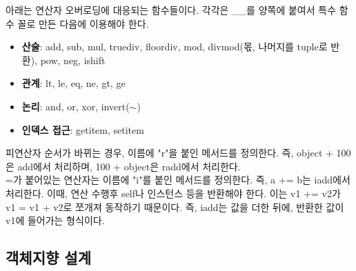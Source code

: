 아래는 연산자 오버로딩에 대응되는 함수들이다. 각각은 \_\_를 양쪽에 붙여서 특수 함수 꼴로 만든 다음에 이용해야 한다.
\begin{itemize}
\item \textbf{산술}: add, sub, mul, truediv, floordiv, mod, divmod(몫, 나머지를 tuple로 반환), pow, neg, ishift
\item \textbf{관계}: lt, le, eq, ne, gt, ge
\item \textbf{논리}: and, or, xor, invert($\sim$)
\item \textbf{인덱스 접근}: getitem, setitem
\end{itemize}

피연산자 순서가 바뀌는 경우, 이름에 "r"을 붙인 메서드를 정의한다. 즉, object + 100은 add에서 처리하며, 100 + object은 radd에서 처리한다.\\
=가 붙어있는 연산자는 이름에 "i"를 붙인 메서드를 정의한다. 즉, a += b는 iadd에서 처리한다. 이때, 연산 수행후 self나 인스턴스 등을 반환해야 한다. 이는 v1 += v2가 v1 = v1 + v2로 쪼개져 동작하기 때문이다. 즉, iadd는 값을 더한 뒤에, 반환한 값이 v1에 들어가는 형식이다.

\subsection{객체지향 설계}

